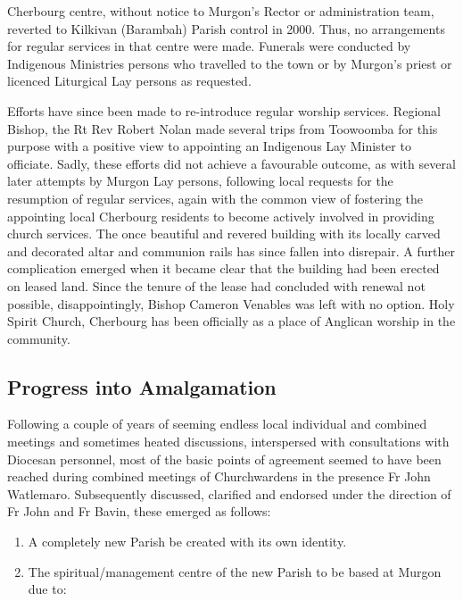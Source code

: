 Cherbourg centre, without notice to Murgon's Rector or administration team, reverted to Kilkivan (Barambah) Parish control in 2000. Thus, no arrangements for regular services in that centre were made. Funerals were conducted by Indigenous Ministries persons who travelled to the town or by Murgon's priest or licenced Liturgical Lay persons as requested.



Efforts have since been made to re-introduce regular worship services. Regional Bishop, the Rt Rev Robert Nolan made several trips from Toowoomba for this purpose with a positive view to appointing an Indigenous Lay Minister to officiate. Sadly, these efforts did not achieve a favourable outcome, as with several later attempts by Murgon Lay persons, following local requests for the resumption of regular services, again with the common view of fostering the appointing local Cherbourg residents to become actively involved in providing church services. The once beautiful and revered building with its locally carved and decorated altar and communion rails has since fallen into disrepair. A further complication emerged when it became clear that the building had been erected on leased land. Since the tenure of the lease had concluded with renewal not possible, disappointingly, Bishop Cameron Venables was left with no option. Holy Spirit Church, Cherbourg has been officially as a place of Anglican worship in the community.



\subsection{Progress into Amalgamation}



Following a couple of years of seeming endless local individual and combined meetings and sometimes heated discussions, interspersed with consultations with Diocesan personnel, most of the basic points of agreement seemed to have been reached during combined meetings of Churchwardens in the presence Fr John Watlemaro. Subsequently discussed, clarified and endorsed under the direction of Fr John and Fr Bavin, these emerged as follows:



\begin{enumerate}

\def\labelenumi{\arabic{enumi}.}

\item

  A completely new Parish be created with its own identity.

\item

  The spiritual/management centre of the new Parish to be based at Murgon due to:

\end{enumerate}



